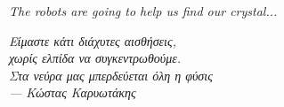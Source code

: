 \thispagestyle{empty}
\mbox{}
\begin{flushright}

{\selectfont
  \vspace{6cm}

  \it{
    The robots are going to help us find our crystal...
  }
  \vspace{3cm}

  \it{Είμαστε κάτι διάχυτες αισθήσεις, \\
      χωρίς ελπίδα να συγκεντρωθούμε. \\
      Στα νεύρα μας μπερδεύεται όλη η φύσις
  }
  \\
  --- \textup{Κώστας Καρυωτάκης}
}
\end{flushright}
